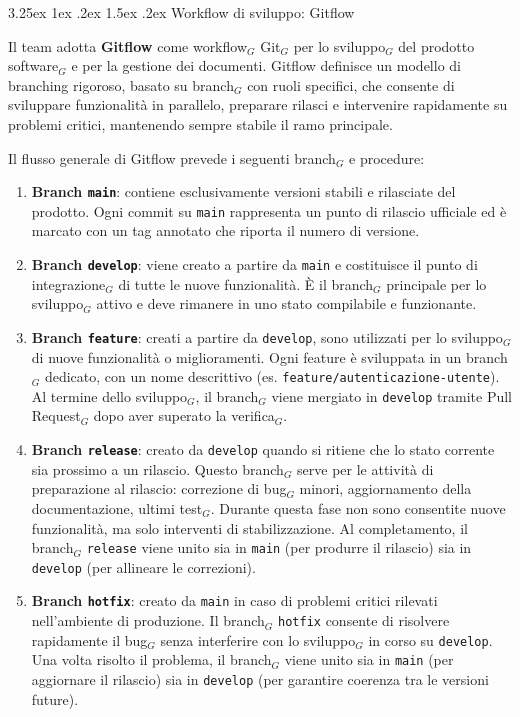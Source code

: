 \documentclass[a4paper, 10pt]{article}
\makeatletter
\renewcommand\paragraph{\@startsection{paragraph}{4}{\z@}%
  {3.25ex \@plus1ex \@minus .2ex}%
  {1.5ex \@plus .2ex}%
  {\normalfont\normalsize\bfseries}}
\makeatother
\begin{document}
\paragraph{Workflow di sviluppo: Gitflow}

Il team adotta \textbf{Gitflow} come workflow$_G$ Git$_G$ per lo sviluppo$_G$ del prodotto software$_G$ e per la gestione dei documenti. Gitflow definisce un modello di branching rigoroso, basato su branch$_G$ con ruoli specifici, che consente di sviluppare funzionalità in parallelo, preparare rilasci e intervenire rapidamente su problemi critici, mantenendo sempre stabile il ramo principale.

Il flusso generale di Gitflow prevede i seguenti branch$_G$ e procedure:

\begin{enumerate}
    \item \textbf{Branch \texttt{main}}: contiene esclusivamente versioni stabili e rilasciate del prodotto. Ogni commit su \texttt{main} rappresenta un punto di rilascio ufficiale ed è marcato con un tag annotato che riporta il numero di versione.
    
    \item \textbf{Branch \texttt{develop}}: viene creato a partire da \texttt{main} e costituisce il punto di integrazione$_G$ di tutte le nuove funzionalità. È il branch$_G$ principale per lo sviluppo$_G$ attivo e deve rimanere in uno stato compilabile e funzionante.
    
    \item \textbf{Branch \texttt{feature}}: creati a partire da \texttt{develop}, sono utilizzati per lo sviluppo$_G$ di nuove funzionalità o miglioramenti. Ogni feature è sviluppata in un branch$_G$ dedicato, con un nome descrittivo (es. \texttt{feature/autenticazione-utente}). Al termine dello sviluppo$_G$, il branch$_G$ viene mergiato in \texttt{develop} tramite Pull Request$_G$ dopo aver superato la verifica$_G$.
    
    \item \textbf{Branch \texttt{release}}: creato da \texttt{develop} quando si ritiene che lo stato corrente sia prossimo a un rilascio. Questo branch$_G$ serve per le attività di preparazione al rilascio: correzione di bug$_G$ minori, aggiornamento della documentazione, ultimi test$_G$. Durante questa fase non sono consentite nuove funzionalità, ma solo interventi di stabilizzazione. Al completamento, il branch$_G$ \texttt{release} viene unito sia in \texttt{main} (per produrre il rilascio) sia in \texttt{develop} (per allineare le correzioni).
    
    \item \textbf{Branch \texttt{hotfix}}: creato da \texttt{main} in caso di problemi critici rilevati nell'ambiente di produzione. Il branch$_G$ \texttt{hotfix} consente di risolvere rapidamente il bug$_G$ senza interferire con lo sviluppo$_G$ in corso su \texttt{develop}. Una volta risolto il problema, il branch$_G$ viene unito sia in \texttt{main} (per aggiornare il rilascio) sia in \texttt{develop} (per garantire coerenza tra le versioni future).
\end{enumerate}
\end{document}
